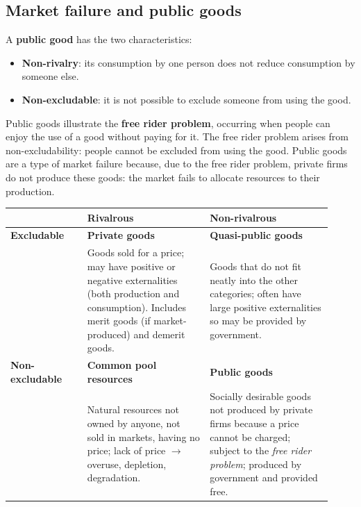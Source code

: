 \documentclass[a4paper,12pt]{article}
\newcommand{\needbold}[1]{\textcolor{red!70!black}{\textbf{#1}}}
\begin{document}
\subsection{Market failure and public goods}
A \needbold{public good} has the two characteristics:
\begin{itemize}
  \item \needbold{Non-rivalry}: its consumption by one person does not reduce consumption by someone else.
  \item \needbold{Non-excludable}: it is not possible to exclude someone from using the good.
\end{itemize}
Public goods illustrate the \needbold{free rider problem}, occurring when people can enjoy the use of a good without paying for it. The free rider problem arises from non-excludability: people cannot be excluded from using the good. Public goods are a type of market failure because, due to the free rider problem, private firms do not produce these goods: the market fails to allocate resources to their production.
\begin{center}
\begin{tabular}{|p{0.22\linewidth}|p{0.35\linewidth}|p{0.35\linewidth}|}
\hline
 & \textbf{Rivalrous} & \textbf{Non-rivalrous} \\
\hline
\textbf{Excludable} & \textbf{Private goods} & \textbf{Quasi-public goods} \\
 & Goods sold for a price; may have positive or negative externalities (both production and consumption). Includes merit goods (if market-produced) and demerit goods. & Goods that do not fit neatly into the other categories; often have large positive externalities so may be provided by government. \\
\hline
\textbf{Non-excludable} & \textbf{Common pool resources} & \textbf{Public goods} \\
 & Natural resources not owned by anyone, not sold in markets, having no price; lack of price $\to$ overuse, depletion, degradation. & Socially desirable goods not produced by private firms because a price cannot be charged; subject to the \textit{free rider problem}; produced by government and provided free. \\
\hline
\end{tabular}
\end{center}
\end{document}
